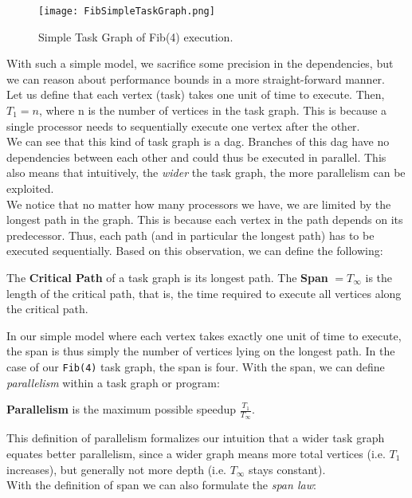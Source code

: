 \documentclass[main.tex]{subfiles}
\begin{document}
\begin{figure}[H]
    \centering
    \texttt{[image: FibSimpleTaskGraph.png]}
    \caption{Simple Task Graph of Fib(4) execution.}
\end{figure}

\noindent With such a simple model, we sacrifice some precision in the dependencies, but we can reason about performance bounds in a more straight-forward manner.\\
Let us define that each vertex (task) takes one unit of time to execute. Then, \(T_{1} = n\), where n is the number of vertices in the task graph. This is because a single processor needs to sequentially execute one vertex after the other.\\
We can see that this kind of task graph is a dag. Branches of this dag have no dependencies between each other and could thus be executed in parallel. This also means that intuitively, the \textit{wider} the task graph, the more parallelism can be exploited.\\[3mm]
We notice that no matter how many processors we have, we are limited by the longest path in the graph. This is because each vertex in the path depends on its predecessor. Thus, each path (and in particular the longest path) has to be executed sequentially. Based on this observation, we can define the following:

\begin{definition}
  The \textbf{Critical Path} of a task graph is its longest path. The \textbf{Span} \(=T_{\infty}\) is the length of the critical path, that is, the time required to execute all vertices along the critical path.
\end{definition}

\noindent In our simple model where each vertex takes exactly one unit of time to execute, the span is thus simply the number of vertices lying on the longest path. In the case of our \texttt{Fib(4)} task graph, the span is four. With the span, we can define \textit{parallelism} within a task graph or program:

\begin{definition}
  \textbf{Parallelism} is the maximum possible speedup \(\frac{T_{1}}{T_{\infty}}\).
\end{definition}

\noindent This definition of parallelism formalizes our intuition that a wider task graph equates better parallelism, since a wider graph means more total vertices (i.e. \(T_{1}\) increases), but generally not more depth (i.e. \(T_{\infty}\) stays constant).\\[3mm]
With the definition of span we can also formulate the \textit{span law}:
\end{document}
